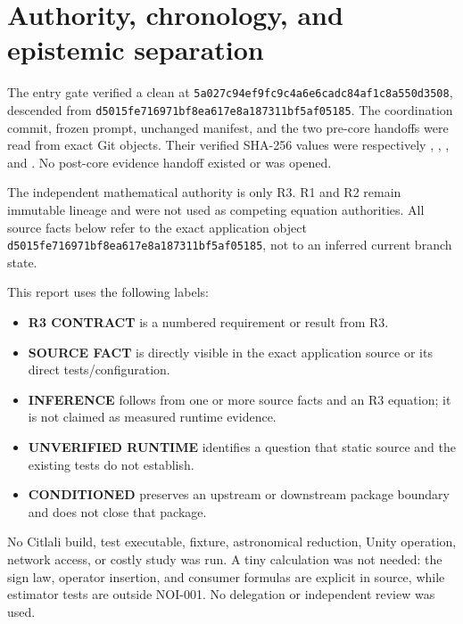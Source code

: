 \documentclass[10pt]{article}
\newcommand{\appsha}{d5015fe716971bf8ea617e8a187311bf5af05185}
\newcommand{\corecommit}{5a027c94ef9fc9c4a6e6cadc84af1c8a550d3508}
\newcommand{\corelabel}{\textbf{R3 CONTRACT}}
\newcommand{\srclabel}{\textbf{SOURCE FACT}}
\newcommand{\inflabel}{\textbf{INFERENCE}}
\newcommand{\unverifiedlabel}{\textbf{UNVERIFIED RUNTIME}}
\newcommand{\conditionedlabel}{\textbf{CONDITIONED}}
\begin{document}
\section{Authority, chronology, and epistemic separation}
\label{sec:authority}

The entry gate verified a clean  at
\texttt{\corecommit}, descended from \texttt{\appsha}.  The coordination commit,
frozen prompt, unchanged manifest, and the two pre-core handoffs were read
from exact Git objects.  Their verified SHA-256 values were respectively
,
,
,
and
.
No post-core evidence handoff existed or was opened.

The independent mathematical authority is only R3.  R1 and R2 remain
immutable lineage and were not used as competing equation authorities.  All
source facts below refer to the exact application object \texttt{\appsha}, not
to an inferred current branch state.

This report uses the following labels:

\begin{itemize}[leftmargin=*]
  \item \corelabel{} is a numbered requirement or result from R3.
  \item \srclabel{} is directly visible in the exact application source or
        its direct tests/configuration.
  \item \inflabel{} follows from one or more source facts and an R3 equation;
        it is not claimed as measured runtime evidence.
  \item \unverifiedlabel{} identifies a question that static source and the
        existing tests do not establish.
  \item \conditionedlabel{} preserves an upstream or downstream package
        boundary and does not close that package.
\end{itemize}

No Citlali build, test executable, fixture, astronomical reduction, Unity
operation, network access, or costly study was run.  A tiny calculation was
not needed: the sign law, operator insertion, and consumer formulas are
explicit in source, while estimator tests are outside NOI-001.  No delegation
or independent review was used.
\end{document}
